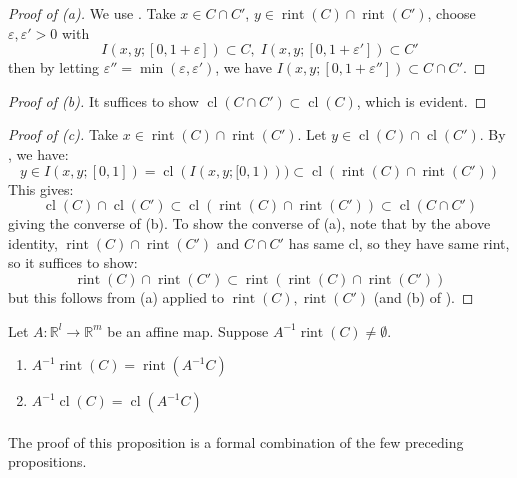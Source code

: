 \begin{proof}[Proof of (a)]
	We use . Take $x\in C\cap C'$, $y\in \operatorname{rint}(C)\cap \operatorname{rint}(C')$, choose $\varepsilon,\varepsilon'>0$ with
	\[
		I(x,y;[0,1+\varepsilon ])\subset C,\;
		I(x,y;[0,1+\varepsilon' ])\subset C'
	\]
	then by letting $\varepsilon''=\min(\varepsilon ,\varepsilon')$, we have $I(x,y;[0,1+\varepsilon'' ])\subset C\cap C'$.
\end{proof}

\begin{proof}[Proof of (b)]
	It suffices to show $\operatorname{cl}(C\cap C')\subset \operatorname{cl}(C)$, which is evident.
\end{proof}

\begin{proof}[Proof of (c)]
	Take $x\in \operatorname{rint}(C) \cap\operatorname{rint}(C')$. Let $y\in \operatorname{cl}(C)\cap \operatorname{cl}(C')$. By , we have:
	\[
		y\in I(x, y;[0, 1])=\operatorname{cl}(I(x, y;[0, 1)))\subset\operatorname{cl}(\operatorname{rint}(C)\cap \operatorname{rint}(C'))
	\]
	This gives:
	\[
		\operatorname{cl}(C)\cap \operatorname{cl}(C')\subset \operatorname{cl}(\operatorname{rint}(C)\cap \operatorname{rint}(C'))\subset \operatorname{cl}(C\cap C')
	\]
	giving the converse of (b). To show the converse of (a), note that by the above identity, $\operatorname{rint}(C)\cap \operatorname{rint}(C')$ and $C\cap C'$ has same cl, so they have same rint, so it suffices to show:
	\[
		\operatorname{rint}(C)\cap \operatorname{rint}(C')\subset
		\operatorname{rint}(\operatorname{rint}(C)\cap \operatorname{rint}(C'))
	\]
	but this follows from (a) applied to $\operatorname{rint}(C),\operatorname{rint}(C')$ (and (b) of ).
\end{proof}

\begin{prop}
	\label{prop:012-inv-img-rule}
	Let $A:\mathbb{R}^l\to \mathbb{R}^m$ be an affine map. Suppose $A^{-1}\operatorname{rint}(C)\neq \emptyset$.
	\begin{enumerate}[label=(\alph*)]
		\item $A^{-1}\operatorname{rint}(C)=\operatorname{rint}(A^{-1}C)$
		\item $A^{-1}\operatorname{cl}(C)=\operatorname{cl}(A^{-1}C)$
	\end{enumerate}
\end{prop}

\paragraph{}The proof of this proposition is a formal combination of the few preceding propositions.

